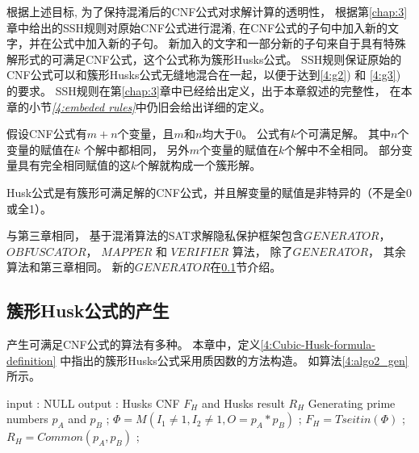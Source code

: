 根据上述目标,
为了保持混淆后的CNF公式对求解计算的透明性，
根据第\ref{chap:3}章中给出的SSH规则对原始CNF公式进行混淆,
在CNF公式的子句中加入新的文字，并在公式中加入新的子句。
新加入的文字和一部分新的子句来自于具有特殊解形式的可满足CNF公式，这个公式称为簇形Husks公式。
SSH规则保证原始的CNF公式可以和簇形Husks公式无缝地混合在一起，以便于达到\ref{4:g2}) 和 \ref{4:g3}) 的要求。
SSH规则在第\ref{chap:3}章中已经给出定义，出于本章叙述的完整性，
在本章的小节\textit{\ref{4:embeded rules}}中仍旧会给出详细的定义。

\begin{definition}[簇形解]\label{4:Cubic-Husk-Solution-definition}
假设CNF公式有$m+n$个变量，且$m$和$n$均大于0。
公式有$k$个可满足解。
其中$n$个变量的赋值在$k$ 个解中都相同，
另外$m$个变量的赋值在$k$个解中不全相同。
部分变量具有完全相同赋值的这$k$个解就构成一个簇形解。
\end{definition}

\begin{definition}[簇形Husks 公式]\label{4:Cubic-Husk-formula-definition}
Husk公式是有簇形可满足解的CNF公式，并且解变量的赋值是非特异的（不是全0或全1）。
\end{definition}


与第三章相同，
基于混淆算法的SAT求解隐私保护框架包含$GENERATOR$， $OBFUSCATOR$， $MAPPER$ 和 $VERIFIER$ 算法，
除了$GENERATOR$，
其余算法和第三章相同。
新的$GENERATOR$在\ref{4:genhusk}节介绍。

\subsection{簇形Husk公式的产生}\label{4:genhusk}
产生可满足CNF公式的算法有多种。
本章中，定义\ref{4:Cubic-Husk-formula-definition} 中指出的簇形Husks公式采用质因数的方法构造。
如算法\ref{4:algo2_gen}所示。


\begin{algorithm*}[b]
\caption{$GENERATOR$}
\label{4:algo2_gen}
\begin{algorithmic}[1]
\STATE input : NULL
\STATE output : Husks CNF $F_H$ and Husks result $R_H$
\STATE Generating prime numbers $p_A$ and $p_B$  ; \label{4:primenumber}
\STATE $\Phi= M(I_1 \neq 1, I_2\neq 1, O=p_A*p_B)$ ;\label{4:multiplePrime}
\STATE $F_H=Tseitin(\Phi)$ ;\label{4:TseitinPHI}
\STATE $R_H=Common(p_A,p_B)$ ;
\end{algorithmic}
\end{algorithm*}

%

